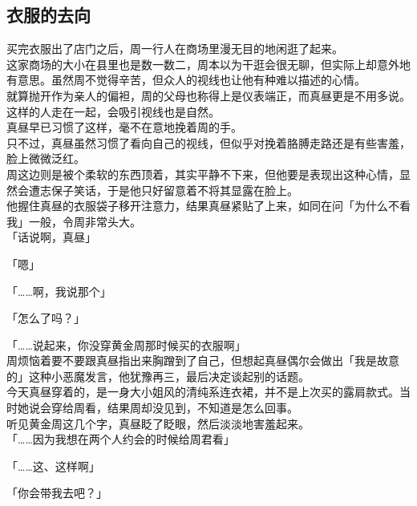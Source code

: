 \subsection{衣服的去向}

买完衣服出了店门之后，周一行人在商场里漫无目的地闲逛了起来。\\

这家商场的大小在县里也是数一数二，周本以为干逛会很无聊，但实际上却意外地有意思。虽然周不觉得辛苦，但众人的视线也让他有种难以描述的心情。\\

就算抛开作为亲人的偏袒，周的父母也称得上是仪表端正，而真昼更是不用多说。这样的人走在一起，会吸引视线也是自然。\\

真昼早已习惯了这样，毫不在意地挽着周的手。\\

只不过，真昼虽然习惯了看向自己的视线，但似乎对挽着胳膊走路还是有些害羞，脸上微微泛红。\\

周这边则是被个柔软的东西顶着，其实平静不下来，但他要是表现出这种心情，显然会遭志保子笑话，于是他只好留意着不将其显露在脸上。\\

他握住真昼的衣服袋子移开注意力，结果真昼紧贴了上来，如同在问「为什么不看我」一般，令周非常头大。\\

「话说啊，真昼」

「嗯」

「……啊，我说那个」

「怎么了吗？」

「……说起来，你没穿黄金周那时候买的衣服啊」\\

周烦恼着要不要跟真昼指出来胸蹭到了自己，但想起真昼偶尔会做出「我是故意的」这种小恶魔发言，他犹豫再三，最后决定谈起别的话题。\\

今天真昼穿着的，是一身大小姐风的清纯系连衣裙，并不是上次买的露肩款式。当时她说会穿给周看，结果周却没见到，不知道是怎么回事。\\

听见黄金周这几个字，真昼眨了眨眼，然后淡淡地害羞起来。\\

「……因为我想在两个人约会的时候给周君看」

「……这、这样啊」

「你会带我去吧？」\\

